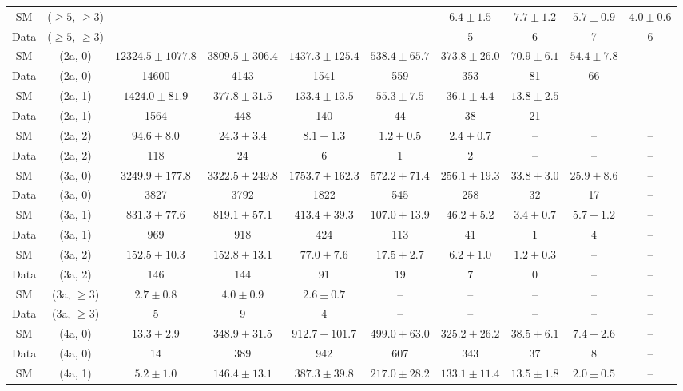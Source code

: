 \begin{table}[h!]
{\begin{tabular}{cccccccccc}
	SM & ($\ge5$, $\ge3$) & -- & -- & -- & -- & $6.4\pm 1.5$ & $7.7\pm 1.2$ & $5.7\pm 0.9$ & $4.0\pm 0.6$ \\[0.5ex] 
	Data & ($\ge5$, $\ge3$) & -- & -- & -- & -- & 5 & 6 & 7 & 6 \\[0.5ex] 
	SM & (2a, 0) & $12324.5\pm 1077.8$ & $3809.5\pm 306.4$ & $1437.3\pm 125.4$ & $538.4\pm 65.7$ & $373.8\pm 26.0$ & $70.9\pm 6.1$ & $54.4\pm 7.8$ & -- \\[0.5ex] 
	Data & (2a, 0) & 14600 & 4143 & 1541 & 559 & 353 & 81 & 66 & -- \\[0.5ex] 
	SM & (2a, 1) & $1424.0\pm 81.9$ & $377.8\pm 31.5$ & $133.4\pm 13.5$ & $55.3\pm 7.5$ & $36.1\pm 4.4$ & $13.8\pm 2.5$ & -- & -- \\[0.5ex] 
	Data & (2a, 1) & 1564 & 448 & 140 & 44 & 38 & 21 & -- & -- \\[0.5ex] 
	SM & (2a, 2) & $94.6\pm 8.0$ & $24.3\pm 3.4$ & $8.1\pm 1.3$ & $1.2\pm 0.5$ & $2.4\pm 0.7$ & -- & -- & -- \\[0.5ex] 
	Data & (2a, 2) & 118 & 24 & 6 & 1 & 2 & -- & -- & -- \\[0.5ex] 
	SM & (3a, 0) & $3249.9\pm 177.8$ & $3322.5\pm 249.8$ & $1753.7\pm 162.3$ & $572.2\pm 71.4$ & $256.1\pm 19.3$ & $33.8\pm 3.0$ & $25.9\pm 8.6$ & -- \\[0.5ex] 
	Data & (3a, 0) & 3827 & 3792 & 1822 & 545 & 258 & 32 & 17 & -- \\[0.5ex] 
	SM & (3a, 1) & $831.3\pm 77.6$ & $819.1\pm 57.1$ & $413.4\pm 39.3$ & $107.0\pm 13.9$ & $46.2\pm 5.2$ & $3.4\pm 0.7$ & $5.7\pm 1.2$ & -- \\[0.5ex] 
	Data & (3a, 1) & 969 & 918 & 424 & 113 & 41 & 1 & 4 & -- \\[0.5ex] 
	SM & (3a, 2) & $152.5\pm 10.3$ & $152.8\pm 13.1$ & $77.0\pm 7.6$ & $17.5\pm 2.7$ & $6.2\pm 1.0$ & $1.2\pm 0.3$ & -- & -- \\[0.5ex] 
	Data & (3a, 2) & 146 & 144 & 91 & 19 & 7 & 0 & -- & -- \\[0.5ex] 
	SM & (3a, $\ge3$) & $2.7\pm 0.8$ & $4.0\pm 0.9$ & $2.6\pm 0.7$ & -- & -- & -- & -- & -- \\[0.5ex] 
	Data & (3a, $\ge3$) & 5 & 9 & 4 & -- & -- & -- & -- & -- \\[0.5ex] 
	SM & (4a, 0) & $13.3\pm 2.9$ & $348.9\pm 31.5$ & $912.7\pm 101.7$ & $499.0\pm 63.0$ & $325.2\pm 26.2$ & $38.5\pm 6.1$ & $7.4\pm 2.6$ & -- \\[0.5ex] 
	Data & (4a, 0) & 14 & 389 & 942 & 607 & 343 & 37 & 8 & -- \\[0.5ex] 
	SM & (4a, 1) & $5.2\pm 1.0$ & $146.4\pm 13.1$ & $387.3\pm 39.8$ & $217.0\pm 28.2$ & $133.1\pm 11.4$ & $13.5\pm 1.8$ & $2.0\pm 0.5$ & -- \\[0.5ex] 

\end{tabular}}
\end{table}
